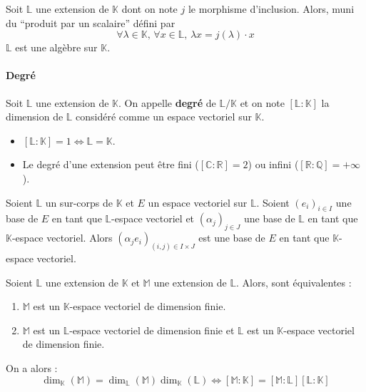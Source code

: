   \begin{proposition}
    Soit $\mathbb{L}$ une extension de $\mathbb{K}$ dont on note $j$ le morphisme d'inclusion. Alors, muni du ``produit par un scalaire'' défini par
    \[ \forall \lambda \in \mathbb{K}, \, \forall x \in \mathbb{L}, \, \lambda x = j(\lambda) \cdot x \]
    $\mathbb{L}$ est une algèbre sur $\mathbb{K}$.
  \end{proposition}

  \paragraph{Degré}

  \begin{definition}
    Soit $\mathbb{L}$ une extension de $\mathbb{K}$. On appelle \textbf{degré} de $\mathbb{L}/\mathbb{K}$ et on note $[\mathbb{L}:\mathbb{K}]$ la dimension de $\mathbb{L}$ considéré comme un espace vectoriel sur $\mathbb{K}$.
  \end{definition}

  \begin{remark}
    \begin{itemize}
      \item $[\mathbb{L}:\mathbb{K}] = 1 \iff \mathbb{L} = \mathbb{K}$.
      \item Le degré d'une extension peut être fini ($[\mathbb{C}:\mathbb{R}] = 2$) ou infini ($[\mathbb{R}:\mathbb{Q}] = +\infty$).
    \end{itemize}
  \end{remark}

  \begin{theorem}
    Soient $\mathbb{L}$ un sur-corps de $\mathbb{K}$ et $E$ un espace vectoriel sur $\mathbb{L}$.
    Soient $(e_i)_{i \in I}$ une base de $E$ en tant que $\mathbb{L}$-espace vectoriel et $(\alpha_j)_{j \in J}$ une base de $\mathbb{L}$ en tant que $\mathbb{K}$-espace vectoriel.
    \newpar
    Alors $(\alpha_j e_i)_{(i,j) \in I \times J}$ est une base de $E$ en tant que $\mathbb{K}$-espace vectoriel.
  \end{theorem}

  \begin{corollary}
    Soient $\mathbb{L}$ une extension de $\mathbb{K}$ et $\mathbb{M}$ une extension de $\mathbb{L}$. Alors, sont équivalentes :
    \begin{enumerate}[label={\bfseries(\roman*)}]
      \item $\mathbb{M}$ est un $\mathbb{K}$-espace vectoriel de dimension finie.
      \item $\mathbb{M}$ est un $\mathbb{L}$-espace vectoriel de dimension finie et $\mathbb{L}$ est un $\mathbb{K}$-espace vectoriel de dimension finie.
    \end{enumerate}
    On a alors :
    \[ \dim_{\mathbb{K}}(\mathbb{M}) = \dim_{\mathbb{L}}(\mathbb{M}) \dim_{\mathbb{K}}(\mathbb{L}) \iff [\mathbb{M}:\mathbb{K}] = [\mathbb{M}:\mathbb{L}] [\mathbb{L}:\mathbb{K}] \]
  \end{corollary}

